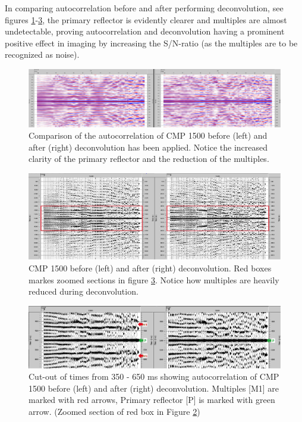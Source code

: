\documentclass[10pt,a4paper]{article}
\begin{document}
\noindent In comparing autocorrelation before and after performing deconvolution, see figures \ref{fig18}-\ref{fig20}, the primary reflector is evidently clearer and multiples are almost undetectable, proving autocorrelation and deconvolution having a prominent positive effect in imaging by increasing the S/N-ratio (as the multiples are to be recognized as noise).

\begin{figure}[H]
\includegraphics[width=\textwidth]{fig18.jpg}
\caption{Comparison of the autocorrelation of CMP 1500 before (left) and after (right) deconvolution has been applied. Notice the increased clarity of the primary reflector and the reduction of the multiples.}
\label{fig18}
\end{figure}

\begin{figure}[H]
\includegraphics[width=\textwidth]{fig19.jpg}
\caption{CMP 1500 before (left) and after (right) deconvolution. Red boxes markes zoomed sections in figure \ref{fig20}. Notice how multiples are heavily reduced during deconvolution.}
\label{fig19}
\end{figure}

\begin{figure}[H]
\includegraphics[width=\textwidth]{fig20.jpg}
\caption{Cut-out of times from 350 - 650 ms showing autocorrelation of CMP 1500 before (left) and after (right) deconvolution. Multiples [M1] are marked with red arrows, Primary reflector [P] is marked with green arrow. (Zoomed section of red box in Figure \ref{fig19})}
\label{fig20}
\end{figure}
\end{document}
